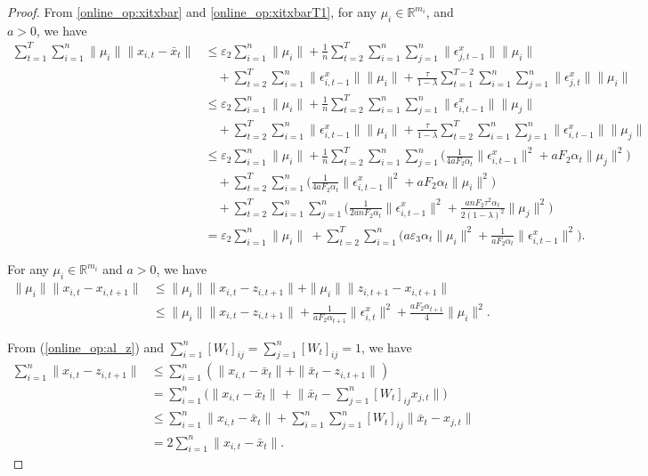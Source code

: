 \documentclass[12pt,draftcls,onecolumn]{IEEEtran}%
\begin{document}
\begin{proof}
From \eqref{online_op:xitxbar} and \eqref{online_op:xitxbarT1}, for any $\mu_i\in\mathbb{R}^{m_i}$, and $a>0$, we have
\begin{align}
\sum_{t=1}^{T}\sum_{i=1}^n\|\mu_i\|\|x_{i,t}-\bar{x}_{t}\|
&\le \varepsilon_2\sum_{i=1}^n\|\mu_i\|
+\frac{1}{n}\sum_{t=2}^{T}\sum_{i=1}^n\sum_{j=1}^n\|\epsilon^x_{j,t-1}\|\|\mu_i\|
\nonumber\\
&\quad+\sum_{t=2}^{T}\sum_{i=1}^n\|\epsilon^x_{i,t-1}\|\|\mu_i\|
+\frac{\tau}{1-\lambda}\sum_{t=1}^{T-2}\sum_{i=1}^n
\sum_{j=1}^n\|\epsilon^x_{j,t}\|\|\mu_i\|\nonumber\\
&\le \varepsilon_2\sum_{i=1}^n\|\mu_i\|
+\frac{1}{n}\sum_{t=2}^{T}\sum_{i=1}^n\sum_{j=1}^n\|\epsilon^x_{i,t-1}\|\|\mu_j\|\nonumber\\
&\quad+\sum_{t=2}^{T}\sum_{i=1}^n\|\epsilon^x_{i,t-1}\|\|\mu_i\|
+\frac{\tau}{1-\lambda}\sum_{t=2}^{T}\sum_{i=1}^n
\sum_{j=1}^n\|\epsilon^x_{i,t-1}\|\|\mu_j\|\nonumber\\
&\le \varepsilon_2\sum_{i=1}^n\|\mu_i\|
+\frac{1}{n}\sum_{t=2}^{T}\sum_{i=1}^n\sum_{j=1}^n\Big(\frac{1}{4aF_2\alpha_t}\|\epsilon^x_{i,t-1}\|^2
+aF_2\alpha_t\|\mu_j\|^2\Big)\nonumber\\
&\quad
+\sum_{t=2}^{T}\sum_{i=1}^n\Big(\frac{1}{4aF_2\alpha_t}\|\epsilon^x_{i,t-1}\|^2
+aF_2\alpha_t\|\mu_i\|^2\Big)\nonumber\\
&\quad
+\sum_{t=2}^{T}\sum_{i=1}^n\sum_{j=1}^n\Big(\frac{1}{2anF_2\alpha_t}\|\epsilon^x_{i,t-1}\|^2
+\frac{anF_2\tau^2\alpha_t}{2(1-\lambda)^2}\|\mu_j\|^2\Big)\nonumber\\
&= \varepsilon_2\sum_{i=1}^n\|\mu_i\|\
+\sum_{t=2}^{T}\sum_{i=1}^n\Big(a\varepsilon_3\alpha_t\|\mu_i\|^2
+\frac{1}{aF_2\alpha_t}\|\epsilon^x_{i,t-1}\|^2\Big).
\label{online_op:xitxbarT}
\end{align}


For any $\mu_i\in\mathbb{R}^{m_i}$ and $a>0$, we have
\begin{align}
\|\mu_i\|\|x_{i,t}-x_{i,t+1}\|
&\le\|\mu_i\|\|x_{i,t}-z_{i,t+1}\|+\|\mu_i\|\|z_{i,t+1}-x_{i,t+1}\|\nonumber\\
&\le\|\mu_i\|\|x_{i,t}-z_{i,t+1}\|+\frac{1}{aF_2\alpha_{t+1}}\|\epsilon^x_{i,t}\|^2
+\frac{aF_2\alpha_{t+1}}{4}\|\mu_i\|^2.\label{online_op:fxx}
\end{align}

From (\ref{online_op:al_z}) and $\sum_{i=1}^n[W_t]_{ij}=\sum_{j=1}^n[W_t]_{ij}=1$,  we have
\begin{align}
\sum_{i=1}^n\|x_{i,t}-z_{i,t+1}\|
&\le \sum_{i=1}^n(\|x_{i,t}-\bar{x}_t\|+\|\bar{x}_t-z_{i,t+1}\|)\nonumber\\
&=\sum_{i=1}^n\Big(\|x_{i,t}-\bar{x}_t\|
+\Big\|\bar{x}_t-\sum_{j=1}^n[W_t]_{ij}x_{j,t}\Big\|\Big)\nonumber\\
&\le\sum_{i=1}^n\|x_{i,t}-\bar{x}_t\|
+\sum_{i=1}^n\sum_{j=1}^n[W_t]_{ij}\|\bar{x}_t-x_{j,t}\|\nonumber\\
&=2\sum_{i=1}^n\|x_{i,t}-\bar{x}_t\|.\label{online_op:xz}
\end{align}




\end{proof}
\end{document}
